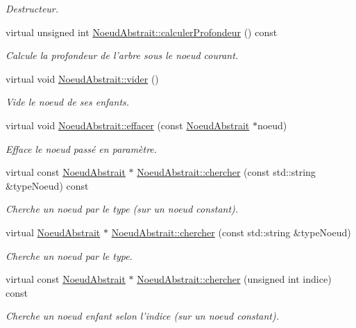 \begin{DoxyCompactItemize}
\begin{DoxyCompactList}\small\item\em Destructeur. \end{DoxyCompactList}\item 
virtual unsigned int \hyperlink{group__inf2990_gad854800087fd6c13f1a63589caefb41d}{Noeud\-Abstrait\-::calculer\-Profondeur} () const 
\begin{DoxyCompactList}\small\item\em Calcule la profondeur de l'arbre sous le noeud courant. \end{DoxyCompactList}\item 
virtual void \hyperlink{group__inf2990_ga55435ee83860c6a2101334ba67bbd9b6}{Noeud\-Abstrait\-::vider} ()
\begin{DoxyCompactList}\small\item\em Vide le noeud de ses enfants. \end{DoxyCompactList}\item 
virtual void \hyperlink{group__inf2990_ga2ab3dc520026d1ad77aa848981688bfd}{Noeud\-Abstrait\-::effacer} (const \hyperlink{class_noeud_abstrait}{Noeud\-Abstrait} $\ast$noeud)
\begin{DoxyCompactList}\small\item\em Efface le noeud passé en paramètre. \end{DoxyCompactList}\item 
virtual const \hyperlink{class_noeud_abstrait}{Noeud\-Abstrait} $\ast$ \hyperlink{group__inf2990_gaeda0df98faf404765d985fcde60fb924}{Noeud\-Abstrait\-::chercher} (const std\-::string \&type\-Noeud) const 
\begin{DoxyCompactList}\small\item\em Cherche un noeud par le type (sur un noeud constant). \end{DoxyCompactList}\item 
virtual \hyperlink{class_noeud_abstrait}{Noeud\-Abstrait} $\ast$ \hyperlink{group__inf2990_ga0868ae108165b071f6c8a68a7265c770}{Noeud\-Abstrait\-::chercher} (const std\-::string \&type\-Noeud)
\begin{DoxyCompactList}\small\item\em Cherche un noeud par le type. \end{DoxyCompactList}\item 
virtual const \hyperlink{class_noeud_abstrait}{Noeud\-Abstrait} $\ast$ \hyperlink{group__inf2990_gac334b078c318e39a065b85572778bf13}{Noeud\-Abstrait\-::chercher} (unsigned int indice) const 
\begin{DoxyCompactList}\small\item\em Cherche un noeud enfant selon l'indice (sur un noeud constant). \end{DoxyCompactList}\item 

\end{DoxyCompactItemize}
